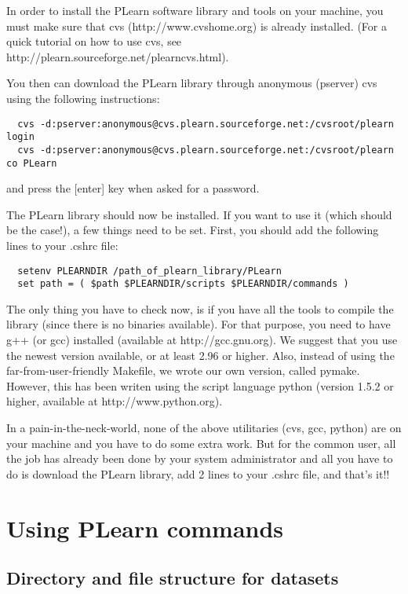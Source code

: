\documentclass[11pt]{book}
\begin{document}
In order to install the PLearn software library and tools on your machine,
you must make sure that cvs (http://www.cvshome.org) is already installed.
(For a quick tutorial on how to use cvs, see
http://plearn.sourceforge.net/plearncvs.html).

You then can download the PLearn library through anonymous (pserver) cvs
using the following instructions:

\topsep=0mm
\begin{verbatim}
  cvs -d:pserver:anonymous@cvs.plearn.sourceforge.net:/cvsroot/plearn login
  cvs -d:pserver:anonymous@cvs.plearn.sourceforge.net:/cvsroot/plearn co PLearn
\end{verbatim}
and press the [enter] key when asked for a password.

The PLearn library should now be installed.  If you want to use it
(which should be the case!), a few things need to be set.  First, you
should add the following lines to your .cshrc file:

\begin{verbatim}
  setenv PLEARNDIR /path_of_plearn_library/PLearn
  set path = ( $path $PLEARNDIR/scripts $PLEARNDIR/commands )
\end{verbatim}

The only thing you have to check now, is if you have all the tools to
compile the library (since there is no binaries available).  For that purpose,
you need to have g++ (or gcc) installed (available at http://gcc.gnu.org).
We suggest that you use the newest version available, or at least 2.96 or higher.
Also, instead of using the far-from-user-friendly Makefile, we wrote our own
version, called pymake.  However, this has been writen using the script language
python (version 1.5.2 or higher, available at http://www.python.org).

In a pain-in-the-neck-world, none of the above utilitaries (cvs, gcc, python)
are on your machine and you have to do some extra work.  But for the common user,
all the job has already been done by your system administrator and all you have
to do is download the PLearn library, add 2 lines to your .cshrc file, and
that's it!!


\chapter{Using PLearn commands}

\section{Directory and file structure for datasets}
\end{document}

